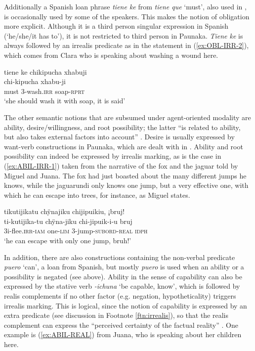 Additionally a Spanish loan phrase \textit{tiene ke} from \textit{tiene que} ‘must’, also used in , is occasionally used by some of the speakers. This makes the notion of obligation more explicit. Although it is a third person singular expression in Spanish (‘he/she/it has to’), it is not restricted to third person in Paunaka. \textit{Tiene ke} is always followed by an irrealis predicate as in the statement in (\ref{ex:OBL-IRR-2}), which comes from Clara who is speaking about washing a wound here.

\ea\label{ex:OBL-IRR-2}
\begingl 
\glpreamble tiene ke chikipucha xhabuji\\
 chi-kipucha xhabu-ji\\ 
\glb must 3-wash.\textsc{irr} soap-\textsc{rprt}\\ 
\glft ‘she should wash it with soap, it is said’
 \trailingcitation{[cux-120410ls.244]}
\xe


The other semantic notions that are subsumed under agent-oriented modality are ability, desire/willingness, and root possibility; the latter “is related to ability, but also takes external factors into account” \citep[31]{deHaan2005}. Desire is usually expressed by want-verb constructions in Paunaka, which are dealt with in . Ability and root possibility can indeed be expressed by irrealis marking, as is the case in (\ref{ex:ABIL-IRR-1}) taken from the narrative of the fox and the jaguar told by Miguel and Juana. The fox had just boasted about the many different jumps he knows, while the jaguarundi only knows one jump, but a very effective one, with which he can escape into trees, for instance, as Miguel states.

\ea\label{ex:ABIL-IRR-1}
\begingl
\glpreamble tikutijikatu chÿnajiku chijipuikiu, ¡bruj!\\
\gla ti-kutijika-tu chÿna-jiku chi-jipuik-i-u bruj\\
\glb 3i-flee.\textsc{irr}-\textsc{iam} one-\textsc{lim} 3-jump-\textsc{subord}-\textsc{real} \textsc{idph}\\
\glft ‘he can escape with only one jump, bruh!’
\endgl
 \trailingcitation{[jmx-n120429ls-x5.365]}
\xe
{}

In addition, there are also constructions containing the non-verbal predicate \textit{puero} ‘can’, a loan from Spanish, but mostly \textit{puero} is used when an ability or a possibility is negated (see  above). Ability in the sense of capability can also be expressed by the stative verb \textit{-ichuna} ‘be capable, know’, which is followed by realis complements if no other factor (e.g. negation, hypotheticality) triggers irrealis marking. This is logical, since the notion of capability is expressed by an extra predicate (see discussion in Footnote \ref{ftn:irrealis}), so that the realis complement can express the “perceived certainty of the factual reality” \citep[67]{Elliott2000}. One example is (\ref{ex:ABIL-REAL}) from Juana, who is speaking about her children here.

